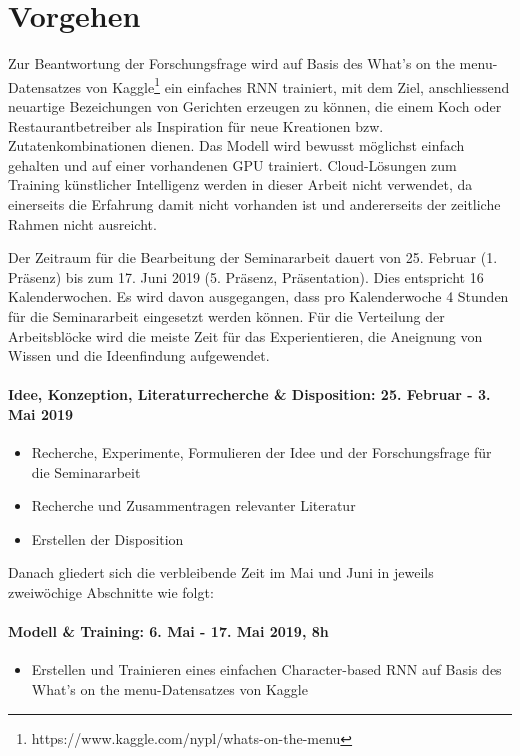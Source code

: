 \section*{Vorgehen}
\label{sec:process}

Zur Beantwortung der Forschungsfrage wird auf Basis des \guillemotleft What's on the menu\guillemotright{}-Datensatzes von Kaggle\footnote{https://www.kaggle.com/nypl/whats-on-the-menu} ein einfaches RNN trainiert, mit dem Ziel, anschliessend
neuartige Bezeichungen von Gerichten erzeugen zu können, die einem Koch oder Restaurantbetreiber als Inspiration für neue Kreationen bzw. Zutatenkombinationen dienen.
Das Modell wird bewusst möglichst einfach gehalten und auf einer vorhandenen GPU trainiert.
Cloud-Lösungen zum Training künstlicher Intelligenz werden in dieser Arbeit nicht verwendet, da einerseits die Erfahrung damit nicht vorhanden ist und andererseits der zeitliche Rahmen nicht ausreicht.

Der Zeitraum für die Bearbeitung der Seminararbeit dauert von 25. Februar (1. Präsenz) bis zum 17. Juni 2019 (5. Präsenz, Präsentation).
Dies entspricht 16 Kalenderwochen.
Es wird davon ausgegangen, dass pro Kalenderwoche 4 Stunden für die Seminararbeit eingesetzt werden können.
Für die Verteilung der Arbeitsblöcke wird die meiste Zeit für das Experientieren, die Aneignung von Wissen und die Ideenfindung aufgewendet.

\paragraph{\textbf{Idee, Konzeption, Literaturrecherche \& Disposition: 25. Februar - 3. Mai 2019}}
\begin{itemize}
    \item Recherche, Experimente, Formulieren der Idee und der Forschungsfrage für die Seminararbeit
    \item Recherche und Zusammentragen relevanter Literatur
    \item Erstellen der Disposition
\end{itemize}

Danach gliedert sich die verbleibende Zeit im Mai und Juni in jeweils zweiwöchige Abschnitte wie folgt:

\paragraph{Modell \& Training: 6. Mai - 17. Mai 2019, 8h}
\begin{itemize}
    \item Erstellen und Trainieren eines einfachen Character-based RNN auf Basis des \guillemotleft What's on the menu\guillemotright{}-Datensatzes von Kaggle
\end{itemize}

